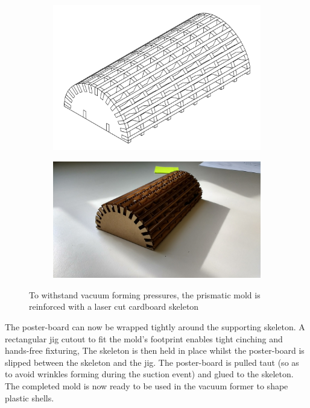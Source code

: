 \documentclass[letterpaper, 10 pt, conference]{ieeeconf}
\begin{document}
\begin{figure}[ht]
\centering
\begin{subfigure}[t]{0.6\columnwidth}
    \centering
    \includegraphics[width=\linewidth]{Mold.png}
\end{subfigure}
\hfill
\begin{subfigure}[t]{0.35\columnwidth}
    \centering
    \includegraphics[width=\linewidth]{SupportingSkeleton.jpg}
\end{subfigure}
\caption{\label{fig:ManufactureSkeleton}To withstand vacuum forming pressures, the prismatic mold is reinforced with a laser cut cardboard skeleton}
\end{figure}

The poster-board can now be wrapped tightly around the supporting skeleton.
A rectangular jig cutout to fit the mold's footprint enables tight cinching and hands-free fixturing,
The skeleton is then held in place whilst the poster-board is slipped between the skeleton and the jig.
The poster-board is pulled taut (so as to avoid wrinkles forming during the suction event) and glued to the skeleton.
The completed mold is now ready to be used in the vacuum former to shape plastic shells.
\end{document}
